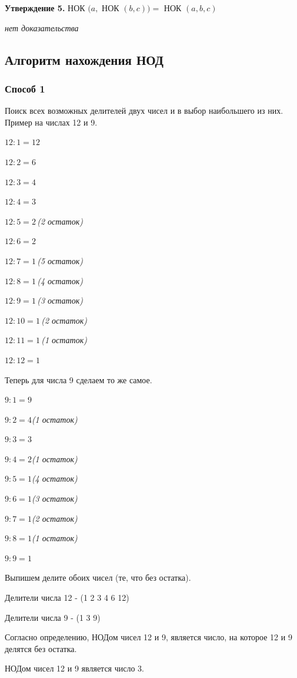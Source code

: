 \documentclass[12pt]{article}
\begin{document}
\textbf{Утверждение 5.} НОК $(a,$ НОК $(b,c))=$ НОК $(a,b,c)$\par
\textit{нет доказательства}\par
\subsection{Алгоритм нахождения НОД}\par
\subsubsection{Способ 1}
Поиск всех возможных делителей двух чисел и в выбор наибольшего из них. Пример на числах 12 и 9.\par
$12 : 1 = 12$\par
$12 : 2 = 6$\par
$12 : 3 = 4$\par
$12 : 4 = 3$\par
$12 : 5 = 2 \,$\textit{(2 остаток)}\par
$12 : 6 = 2$\par
$12 : 7 = 1 \,$\textit{(5 остаток)}\par
$12 : 8 = 1 \,$\textit{(4 остаток)}\par
$12 : 9 = 1 \,$\textit{(3 остаток)}\par
$12 : 10 = 1 \,$\textit{(2 остаток)}\par
$12 : 11 = 1 \,$\textit{(1 остаток)}\par
$12 : 12 = 1$\par
Теперь для числа 9 сделаем то же самое.\par
$9 : 1 = 9$\par
$9 : 2 = 4$\textit{(1 остаток)}\par
$9 : 3 = 3$\par
$9 : 4 = 2$\textit{(1 остаток)}\par
$9 : 5 = 1$\textit{(4 остаток)}\par
$9 : 6 = 1$\textit{(3 остаток)}\par
$9 : 7 = 1$\textit{(2 остаток)}\par
$9 : 8 = 1$\textit{(1 остаток)}\par
$9 : 9 = 1$\par
Выпишем делите обоих чисел (те, что без остатка).\par
Делители числа 12 - (1 2 3 4 6 12)\par
Делители числа 9 - (1 3 9)\par
Согласно определению, НОДом чисел 12 и 9, является число, на которое 12 и 9 делятся без остатка.\par
НОДом чисел 12 и 9 является число 3.\par
\end{document}
